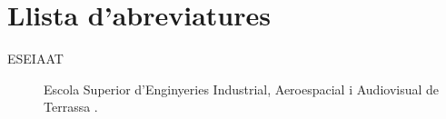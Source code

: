 \chapter*{Llista d'abreviatures}

\begin{description}
	\item[ESEIAAT] Escola Superior d’Enginyeries Industrial, Aeroespacial i Audiovisual de Terrassa \cite{eseiaat}.
\end{description}